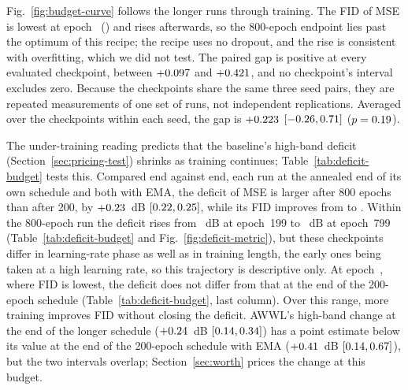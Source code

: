 
Fig.~\ref{fig:budget-curve} follows the longer runs through training. The FID
of MSE is lowest at epoch~\longBestEpochMSE{} (\longBestFIDMSE) and rises
afterwards, so the 800-epoch endpoint lies past the optimum of this recipe;
the recipe uses no dropout, and the rise is consistent with overfitting,
which we did not test. The paired gap is positive at every evaluated
checkpoint, between $+0.097$ and $+0.421$,
and no checkpoint's interval excludes zero. Because the checkpoints share the
same three seed pairs, they are repeated measurements of one set of runs, not
independent replications. Averaged over the checkpoints within each seed, the
gap is $+0.223$ $[-0.26, 0.71]$ ($p = 0.19$).


The under-training reading predicts that the baseline's high-band deficit
(Section~\ref{sec:pricing-test}) shrinks as training continues;
Table~\ref{tab:deficit-budget} tests this. Compared end against end, each run
at the annealed end of its own schedule and both with EMA, the deficit of MSE
is larger after 800 epochs than after 200, by $+0.23$~dB
$[0.22, 0.25]$, while its FID improves from
\budFIDMSEShortEmaDdim{} to \budFIDMSELongDdim. Within the 800-epoch run the
deficit rises from \trajDefMSEOneNinetyNine~dB at epoch~199 to
\trajDefMSESevenNinetyNine~dB at epoch~799 (Table~\ref{tab:deficit-budget} and
Fig.~\ref{fig:deficit-metric}), but these checkpoints differ in learning-rate
phase as well as in training length, the early ones being taken at a high
learning rate, so this trajectory is descriptive only. At
epoch~\longBestEpochMSE, where FID is lowest, the deficit does not differ from
that at the end of the 200-epoch schedule (Table~\ref{tab:deficit-budget},
last column). Over this range, more training improves FID without closing the
deficit. AWWL's high-band change at the end of the longer schedule
($+0.24$~dB
$[0.14, 0.34]$) has a point
estimate below its value at the end of the 200-epoch schedule with EMA
($+0.41$~dB $[0.14, 0.67]$), but the two
intervals overlap; Section~\ref{sec:worth} prices the change at this budget.

